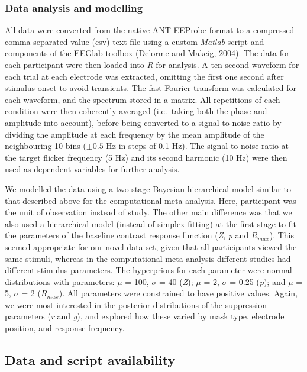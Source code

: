 \documentclass[]{article}
\begin{document}
\hypertarget{data-analysis-and-modelling}{%
\subsubsection{Data analysis and modelling}\label{data-analysis-and-modelling}}

All data were converted from the native ANT-EEProbe format to a compressed comma-separated value (csv) text file using a custom \emph{Matlab} script and components of the EEGlab toolbox (Delorme and Makeig, 2004). The data for each participant were then loaded into \emph{R} for analysis. A ten-second waveform for each trial at each electrode was extracted, omitting the first one second after stimulus onset to avoid transients. The fast Fourier transform was calculated for each waveform, and the spectrum stored in a matrix. All repetitions of each condition were then coherently averaged (i.e.~taking both the phase and amplitude into account), before being converted to a signal-to-noise ratio by dividing the amplitude at each frequency by the mean amplitude of the neighbouring 10 bins (\(\pm0.5\) Hz in steps of 0.1 Hz). The signal-to-noise ratio at the target flicker frequency (5 Hz) and its second harmonic (10 Hz) were then used as dependent variables for further analysis.

We modelled the data using a two-stage Bayesian hierarchical model similar to that described above for the computational meta-analysis. Here, participant was the unit of observation instead of study. The other main difference was that we also used a hierarchical model (instead of simplex fitting) at the first stage to fit the parameters of the baseline contrast response function (\emph{Z}, \emph{p} and \(R_{max}\)). This seemed appropriate for our novel data set, given that all participants viewed the same stimuli, whereas in the computational meta-analysis different studies had different stimulus parameters. The hyperpriors for each parameter were normal distributions with parameters: \(\mu\) = 100, \(\sigma\) = 40 (\emph{Z}); \(\mu\) = 2, \(\sigma\) = 0.25 (\emph{p}); and \(\mu\) = 5, \(\sigma\) = 2 (\(R_{max}\)). All parameters were constrained to have positive values. Again, we were most interested in the posterior distributions of the suppression parameters (\emph{r} and \emph{g}), and explored how these varied by mask type, electrode position, and response frequency.

\hypertarget{data-and-script-availability}{%
\subsection{Data and script availability}\label{data-and-script-availability}}
\end{document}

